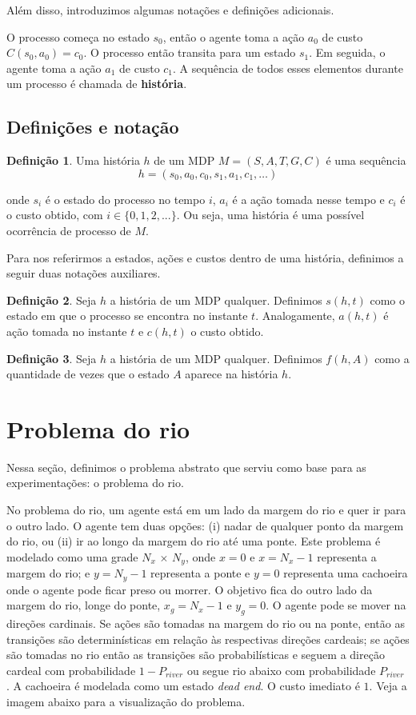 \documentclass{article}
\begin{document}
Além disso, introduzimos algumas notações e definições adicionais. 

O processo começa no estado $s_0$, então o agente toma a ação $a_0$ de custo $C(s_0,a_0) = c_0$. O processo então transita para um estado $s_1$. Em seguida, o agente toma a ação $a_1$ de custo $c_1$. A sequência de todos esses elementos durante um processo é chamada de \textbf{história}.

\subsection{Definições e notação}

\textbf{Definição 1}. Uma história $h$ de um MDP $M = (S, A , T, G, C)$ é uma sequência
\[h = (s_0,a_0,c_0,s_1,a_1,c_1,\dots)\]

onde $s_i$ é o estado do processo no tempo $i$, $a_i$ é a ação tomada nesse tempo e $c_i$ é o custo obtido, com $i \in \{0,1,2,...\}$. Ou seja, uma história é uma possível ocorrência de processo de $M$.

Para nos referirmos a estados, ações e custos dentro de uma história, definimos a seguir duas notações auxiliares.

\textbf{Definição 2}. Seja $h$ a história de um MDP qualquer. Definimos $s(h,t)$ como o estado em que o processo se encontra no instante $t$. Analogamente, $a(h,t)$ é ação tomada no instante $t$ e $c(h,t)$ o custo obtido. 

\textbf{Definição 3}. Seja $h$ a história de um MDP qualquer. Definimos $f(h,A)$ como a quantidade de vezes que o estado $A$ aparece na história $h$.

\section{Problema do rio}

Nessa seção, definimos o problema abstrato que serviu como base para as experimentações: o problema do rio.

No problema do rio, um agente está em um lado da margem do rio e quer ir para o outro lado. O agente tem duas opções:
(i) nadar de qualquer ponto da margem do rio, ou (ii) ir ao longo da margem do rio até uma ponte. Este problema é modelado
como uma grade $N_x$ $\times$ $N_y$, onde $x = 0$ e $x = N_x-1$ representa a margem do rio; e $y = N_y-1$ representa a ponte e $y = 0$ representa uma cachoeira onde o agente pode ficar preso ou morrer. O objetivo fica do outro lado da margem do rio, longe do
ponte, $x_g = N_x-1$ e $y_g = 0$. O agente pode se mover na direções cardinais. Se ações são tomadas na margem do rio ou
na ponte, então as transições são determinísticas em relação às respectivas direções cardeais; se ações são tomadas no rio então
as transições são probabilísticas e seguem a direção cardeal com probabilidade $1 - P_{river}$ ou segue rio abaixo com probabilidade $P_{river}$ . A cachoeira é modelada como um estado \textit{dead end}. O custo imediato é $1$. Veja a imagem abaixo para a visualização do problema.
\end{document}
